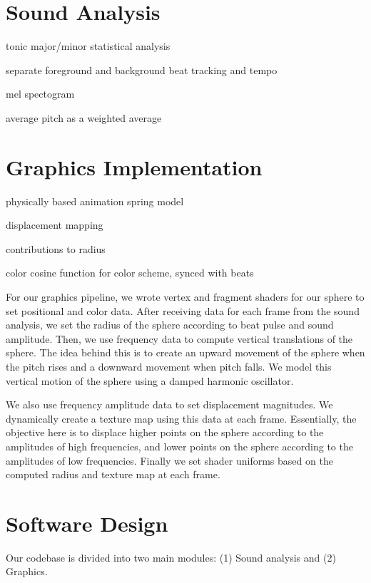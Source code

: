 \documentclass{article}
\begin{document}
\section{Sound Analysis}

tonic
major/minor
statistical analysis

separate foreground and background
beat tracking and tempo

mel spectogram

average pitch as a weighted average


\section{Graphics Implementation}

physically based animation spring model

displacement mapping

contributions to radius

color cosine function for color scheme, synced with beats

For our graphics pipeline, we wrote vertex and fragment shaders for our sphere to set positional and color data. After receiving data for each frame from the sound analysis, we set the radius of the sphere according to beat pulse and sound amplitude. Then, we use frequency data to compute vertical translations of the sphere. The idea behind this is to create an upward movement of the sphere when the pitch rises and a downward movement when pitch falls. We model this vertical motion of the sphere using a damped harmonic oscillator. 

We also use frequency amplitude data to set displacement magnitudes. We dynamically create a texture map using this data at each frame. Essentially, the objective here is to displace higher points on the sphere according to the amplitudes of high frequencies, and lower points on the sphere according to the amplitudes of low frequencies. Finally we set shader uniforms based on the computed radius and texture map at each frame.


\section{Software Design}
Our codebase is divided into two main modules: (1) Sound analysis and (2) Graphics. 
\end{document}
